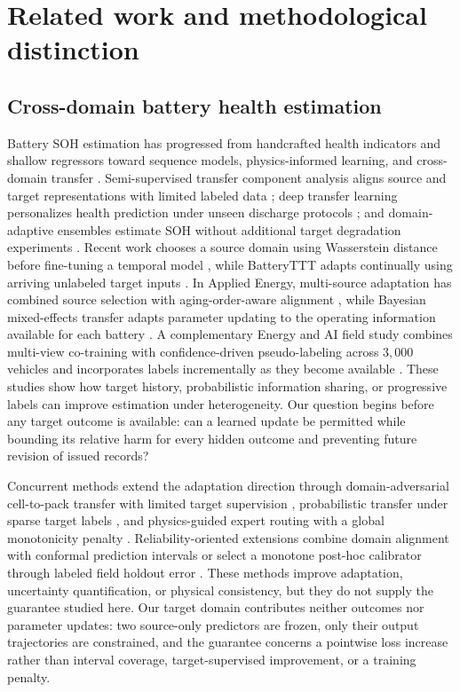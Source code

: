 \documentclass[preprint,12pt]{elsarticle}
\begin{document}
\section{Related work and methodological distinction}

\subsection{Cross-domain battery health estimation}

Battery SOH estimation has progressed from handcrafted health indicators and shallow regressors toward sequence models, physics-informed learning, and cross-domain transfer \citep{ng2020mlbattery,roman2021pipeline,wang2024pinn}. Semi-supervised transfer component analysis aligns source and target representations with limited labeled data \citep{li2020sstca}; deep transfer learning personalizes health prediction under unseen discharge protocols \citep{ma2022personalized}; and domain-adaptive ensembles estimate SOH without additional target degradation experiments \citep{lu2023without}. Recent work chooses a source domain using Wasserstein distance before fine-tuning a temporal model \citep{duan2025wasserstein}, while BatteryTTT adapts continually using arriving unlabeled target inputs \citep{feng2024batteryttt}. In Applied Energy, multi-source adaptation has combined source selection with aging-order-aware alignment \citep{qiu2024multisource}, while Bayesian mixed-effects transfer adapts parameter updating to the operating information available for each battery \citep{zhang2025bayesian}. A complementary Energy and AI field study combines multi-view co-training with confidence-driven pseudo-labeling across $3{,}000$ vehicles and incorporates labels incrementally as they become available \citep{hadzalic2025field}. These studies show how target history, probabilistic information sharing, or progressive labels can improve estimation under heterogeneity. Our question begins before any target outcome is available: can a learned update be permitted while bounding its relative harm for every hidden outcome and preventing future revision of issued records?

Concurrent methods extend the adaptation direction through domain-adversarial cell-to-pack transfer with limited target supervision \citep{shu2026celltopack}, probabilistic transfer under sparse target labels \citep{shao2026probabilistic}, and physics-guided expert routing with a global monotonicity penalty \citep{jiang2026phasemoe}. Reliability-oriented extensions combine domain alignment with conformal prediction intervals \citep{filgueira2026conformalized} or select a monotone post-hoc calibrator through labeled field holdout error \citep{nyachionjeka2026safecalibrated}. These methods improve adaptation, uncertainty quantification, or physical consistency, but they do not supply the guarantee studied here. Our target domain contributes neither outcomes nor parameter updates: two source-only predictors are frozen, only their output trajectories are constrained, and the guarantee concerns a pointwise loss increase rather than interval coverage, target-supervised improvement, or a training penalty.
\end{document}
